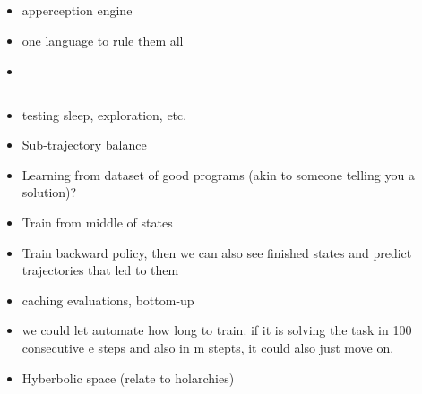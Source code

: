 \subsection{}
\begin{itemize}
    \item apperception engine
    \item one language to rule them all
    \item 
\end{itemize}

\subsection{}
\begin{itemize}
    \item testing sleep, exploration, etc. 
    \item Sub-trajectory balance
    \item Learning from dataset of good programs (akin to someone telling you a solution)? 
    \item Train from middle of states
    \item Train backward policy, then we can also see finished states and predict trajectories that led to them
    \item caching evaluations, bottom-up
    \item we could let automate how long to train. if it is solving the task in 100 consecutive e steps and also in m stepts, it could also just move on. 
    \item Hyberbolic space (relate to holarchies)
\end{itemize}
































\subsubsection{}

